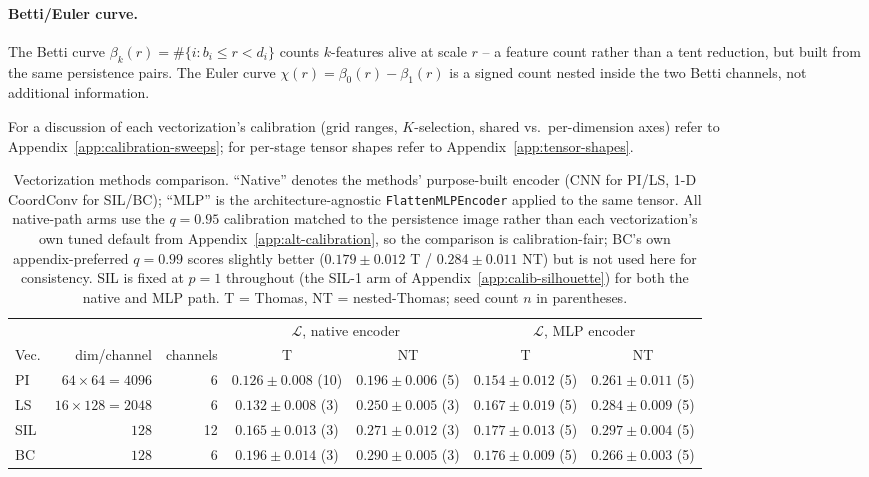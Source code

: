 \documentclass[11pt,letterpaper]{article}
\newcommand{\1}{\mathds{1}}
\theoremstyle{plain}
\theoremstyle{definitioncolon}
\begin{document}
\paragraph{Betti/Euler curve.} The Betti curve $\beta_k(r) = \#\{i : b_i
\leq r < d_i\}$ counts $k$-features alive at scale $r$ -- a feature count
rather than a tent reduction, but built from the same persistence pairs.
The Euler curve $\chi(r) = \beta_0(r) - \beta_1(r)$ is a signed count nested
inside the two Betti channels, not additional information.

For a discussion of each vectorization's calibration (grid ranges, $K$-selection, shared vs.\ per-dimension
axes) refer to Appendix~\ref{app:calibration-sweeps}; for per-stage tensor
shapes refer to Appendix~\ref{app:tensor-shapes}.

\begin{table}[tbp]
\centering
\footnotesize
\begin{tabular}{lrrcccc}
\toprule
 & & & \multicolumn{2}{c}{$\mathcal{L}$, native encoder} & \multicolumn{2}{c}{$\mathcal{L}$, MLP encoder} \\
\cmidrule(lr){4-5}\cmidrule(lr){6-7}
Vec. & dim/channel & channels & T & NT & T & NT \\
\midrule
PI  & $64\times64=4096$ & 6  & $0.126 \pm 0.008$ (10) & $0.196 \pm 0.006$ (5) & $0.154 \pm 0.012$ (5) & $0.261 \pm 0.011$ (5) \\
LS  & $16\times128=2048$ & 6  & $0.132 \pm 0.008$ (3)  & $0.250 \pm 0.005$ (3) & $0.167 \pm 0.019$ (5) & $0.284 \pm 0.009$ (5) \\
SIL & $128$              & 12 & $0.165 \pm 0.013$ (3)  & $0.271 \pm 0.012$ (3) & $0.177 \pm 0.013$ (5) & $0.297 \pm 0.004$ (5) \\
BC  & $128$              & 6  & $0.196 \pm 0.014$ (3)  & $0.290 \pm 0.005$ (3) & $0.176 \pm 0.009$ (5) & $0.266 \pm 0.003$ (5) \\
\bottomrule
\end{tabular}
\caption{Vectorization methods comparison. ``Native'' denotes the methods'
purpose-built encoder (CNN for PI/LS, 1-D CoordConv for SIL/BC); ``MLP'' is
the architecture-agnostic \texttt{FlattenMLPEncoder} applied to the same
tensor. All native-path arms use the $q=0.95$ calibration matched to the
persistence image rather than each
vectorization's own tuned default from Appendix~\ref{app:alt-calibration},
so the comparison is calibration-fair;
BC's own appendix-preferred $q=0.99$ scores slightly better
($0.179\pm0.012$ T / $0.284\pm0.011$ NT) but is not used here for
consistency. SIL is fixed at $p=1$ throughout (the SIL-1 arm of
Appendix~\ref{app:calib-silhouette}) for both the native and MLP path. T =
Thomas, NT = nested-Thomas; seed count $n$ in parentheses.}
\label{tab:main-comparison}
\end{table}
\end{document}
